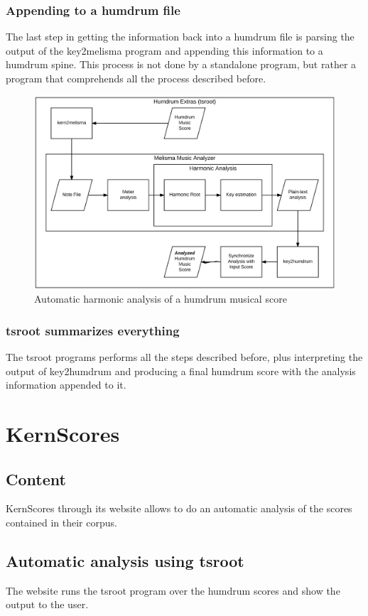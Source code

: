   \subsubsection{Appending to a humdrum file}
    The last step in getting the information back into a humdrum file is parsing the output of the key2melisma program and appending this information to a humdrum spine. This process is not done by a standalone program, but rather a program that comprehends all the process described before.

    \begin{figure}[ht]
      \centering
        \includegraphics[width=1.0\textwidth]{04-methodology/figures/3}
      \caption{Automatic harmonic analysis of a humdrum musical score}
      \label{fig:software_stack3}
    \end{figure}
    
  \subsubsection{tsroot summarizes everything}
    The tsroot programs performs all the steps described before, plus interpreting the output of key2humdrum and producing a final humdrum score with the analysis information appended to it.
\section{KernScores}
  \subsection{Content}
  KernScores through its website allows to do an automatic analysis of the scores contained in their corpus.
  \subsection{Automatic analysis using tsroot}
  The website runs the tsroot program over the humdrum scores and show the output to the user.
